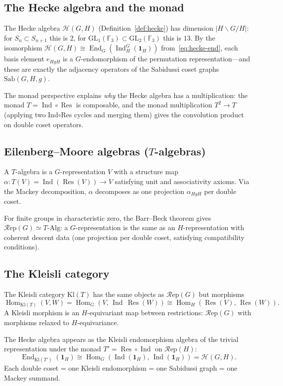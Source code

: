 \documentclass[12pt,a4paper]{article}
\theoremstyle{definition}
\theoremstyle{remark}
\newcommand{\F}{\mathbb{F}}
\newcommand{\End}{\operatorname{End}}
\newcommand{\Hom}{\operatorname{Hom}}
\newcommand{\Ind}{\operatorname{Ind}}
\newcommand{\Res}{\operatorname{Res}}
\newcommand{\GL}{\mathrm{GL}}
\newcommand{\Rep}{\mathcal{R}\mathrm{ep}}
\newcommand{\Kl}{\mathrm{Kl}}
\newcommand{\Sab}{\mathrm{Sab}}
\newcommand{\Hecke}{\mathcal{H}}
\begin{document}
\subsection{The Hecke algebra and the monad}

The Hecke algebra $\Hecke(G, H)$ (Definition~\ref{def:hecke}) has
dimension $|H \backslash G / H|$: for $S_n \subset S_{n+1}$ this
is $2$, for $\GL_1(\F_3) \subset \GL_2(\F_3)$ this is $13$. By
the isomorphism $\Hecke(G,H) \cong \End_G(\Ind_H^G(\mathbf{1}_H))$
from~\eqref{eq:hecke-end}, each basis element $e_{HgH}$ is a
$G$-endomorphism of the permutation representation---and these are
exactly the adjacency operators of the Sabidussi coset graphs
$\Sab(G, H, g)$.

The monad perspective explains \emph{why} the Hecke algebra has a
multiplication: the monad $T = \Ind \circ \Res$ is composable, and
the monad multiplication $T^2 \to T$ (applying two Ind$\circ$Res
cycles and merging them) gives the convolution product on double
coset operators.

\subsection{Eilenberg--Moore algebras ($T$-algebras)}

A $T$-algebra is a $G$-representation $V$ with a structure map
$\alpha : T(V) = \Ind(\Res(V)) \to V$ satisfying unit and
associativity axioms. Via the Mackey decomposition, $\alpha$
decomposes as one projection $\alpha_{HgH}$ per double coset.

For finite groups in characteristic zero, the Barr--Beck theorem gives
$\Rep(G) \simeq T\text{-}\mathrm{Alg}$: a $G$-representation is the
same as an $H$-representation with coherent descent data (one
projection per double coset, satisfying compatibility conditions).

\subsection{The Kleisli category}

The Kleisli category $\Kl(T)$ has the same objects as $\Rep(G)$ but
morphisms
\[
  \Hom_{\Kl(T)}(V, W)
  = \Hom_G(V,\, \Ind\,\Res(W))
  \cong \Hom_H(\Res(V),\, \Res(W)).
\]
A Kleisli morphism is an $H$-equivariant map between restrictions:
$\Rep(G)$ with morphisms relaxed to $H$-equivariance.

The Hecke algebra appears as the Kleisli endomorphism algebra
of the trivial representation under the monad
$T' = \Res \circ \Ind$ on $\Rep(H)$:
\[
  \End_{\Kl(T')}(\mathbf{1}_H)
  \cong \Hom_G(\Ind(\mathbf{1}_H),\, \Ind(\mathbf{1}_H))
  = \Hecke(G, H).
\]
Each double coset = one Kleisli endomorphism = one Sabidussi graph
= one Mackey summand.
\end{document}
